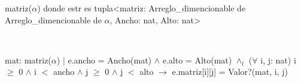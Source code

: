 \begin{Representacion}
	
	
	\begin{Estructura}{matriz($\alpha$)}
		donde estr es tupla<matriz: Arreglo\_dimencionable de Arreglo\_dimencionable de $\alpha$, Ancho: nat, Alto: nat>
	\end{Estructura}
	
	
	~	
	
	{mat: matriz($\alpha$) $|$ e.ancho = Ancho(mat) $\land$ e.alto = Alto(mat) $\land _l$ ($\forall$ i, j: nat) i $\geq$ $0$ $\land$ i $<$ ancho $\land$ j $\geq$ $0$ $\land$ j $<$ alto $\rightarrow$ e.matriz[i][j] = Valor?(mat, i, j) }
\end{Representacion}